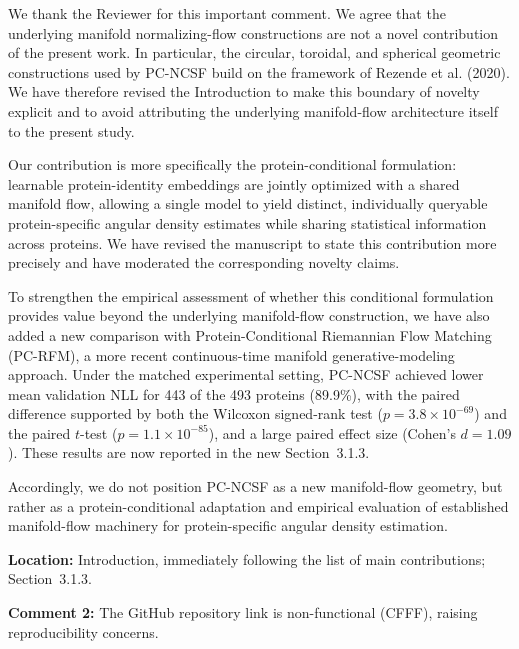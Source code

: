 \documentclass[a4paper,11pt]{article}
\newcommand{\reviewercomment}[2]{%
    \begin{reviewerscomment}
        \textbf{Comment #1:} #2
    \end{reviewerscomment}
}
\newcommand{\response}[1]{%
    \begin{myresponse}
        #1
    \end{myresponse}
    \vspace{5mm}
}
\begin{document}
\response{
We thank the Reviewer for this important comment. We agree that the underlying
manifold normalizing-flow constructions are not a novel contribution of the
present work. In particular, the circular, toroidal, and spherical geometric
constructions used by PC-NCSF build on the framework of Rezende et al.
(2020). We have therefore revised the Introduction to make this boundary of
novelty explicit and to avoid attributing the underlying manifold-flow
architecture itself to the present study.

Our contribution is more specifically the protein-conditional formulation:
learnable protein-identity embeddings are jointly optimized with a shared
manifold flow, allowing a single model to yield distinct, individually
queryable protein-specific angular density estimates while sharing statistical
information across proteins. We have revised the manuscript to state this
contribution more precisely and have moderated the corresponding novelty
claims.

To strengthen the empirical assessment of whether this conditional
formulation provides value beyond the underlying manifold-flow construction,
we have also added a new comparison with Protein-Conditional Riemannian Flow
Matching (PC-RFM), a more recent continuous-time manifold generative-modeling
approach. Under the matched experimental setting, PC-NCSF achieved lower
mean validation NLL for 443 of the 493 proteins (89.9\%), with the paired
difference supported by both the Wilcoxon signed-rank test
($p = 3.8\times10^{-69}$) and the paired $t$-test
($p = 1.1\times10^{-85}$), and a large paired effect size
(Cohen's $d = 1.09$). These results are now reported in the new
Section~3.1.3.

Accordingly, we do not position PC-NCSF as a new manifold-flow geometry, but
rather as a protein-conditional adaptation and empirical evaluation of
established manifold-flow machinery for protein-specific angular density
estimation.

\textbf{Location:} Introduction, immediately following the list of main
contributions; Section~3.1.3.
}


\reviewercomment{2}{
The GitHub repository link is non-functional (CFFF), raising reproducibility
concerns.
}
\end{document}
